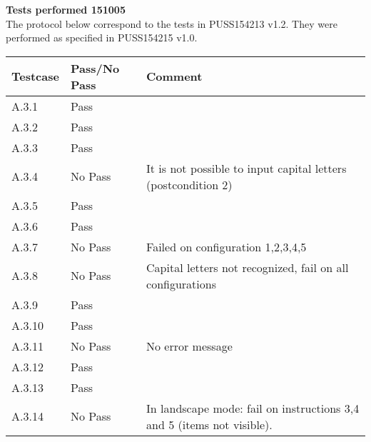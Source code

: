 \renewcommand{\testdate}{151005}
\textbf{ Tests performed \testdate} \\
The protocol below correspond to the tests in PUSS154213 v1.2. They were performed as specified in PUSS154215 v1.0.
\begin{center}
  	\begin{tabular}{| p{3cm} | p{5cm} | p{5cm} |}
    		\hline
	    	\textbf{Testcase}			& \textbf{Pass/No Pass} 	& \textbf{Comment} \\ \hline
    		A.3.1		 					& Pass  							&  				\\ \hline
    		A.3.2		 					& Pass 							& 				 \\	\hline
    		A.3.3		 					& Pass 							& 				 \\	\hline
    		A.3.4		 					& No Pass 					& It is not possible to input capital letters (postcondition 2)				 \\	\hline
    		A.3.5		 					& Pass 							& 				 \\	\hline
    		A.3.6		 					& Pass 							& 				 \\	\hline
    		A.3.7		 					& No Pass 							& Failed on configuration 1,2,3,4,5				 \\	\hline
    		A.3.8		 					& No Pass 							& Capital letters not recognized, fail on all configurations				 \\	\hline
    		A.3.9		 					& Pass 							& 				 \\	\hline
    		A.3.10	 						& Pass 							& 				 \\	\hline
    		A.3.11	 						& No Pass 							& No error message				 \\	\hline
    		A.3.12	 						& Pass 							& 				 \\	\hline
    		A.3.13	 						& Pass						& 				 \\	\hline
    		A.3.14	 						& No Pass 							& In landscape mode: fail on instructions 3,4 and 5 (items not visible).   				 \\	\hline
 	\end{tabular}
\end{center}